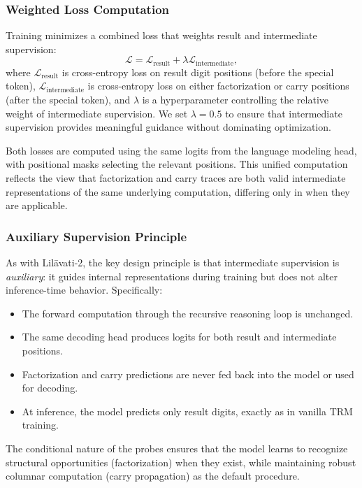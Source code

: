 \subsubsection{Weighted Loss Computation}
Training minimizes a combined loss that weights result and intermediate supervision:
\[
\mathcal{L} = \mathcal{L}_{\text{result}} + \lambda \mathcal{L}_{\text{intermediate}},
\]
where $\mathcal{L}_{\text{result}}$ is cross-entropy loss on result digit positions (before the special token), $\mathcal{L}_{\text{intermediate}}$ is cross-entropy loss on either factorization or carry positions (after the special token), and $\lambda$ is a hyperparameter controlling the relative weight of intermediate supervision. We set $\lambda = 0.5$ to ensure that intermediate supervision provides meaningful guidance without dominating optimization.

Both losses are computed using the same logits from the language modeling head, with positional masks selecting the relevant positions. This unified computation reflects the view that factorization and carry traces are both valid intermediate representations of the same underlying computation, differing only in when they are applicable.

\subsubsection{Auxiliary Supervision Principle}
As with Lil\={a}vati-2, the key design principle is that intermediate supervision is \emph{auxiliary}: it guides internal representations during training but does not alter inference-time behavior. Specifically:
\begin{itemize}
\item The forward computation through the recursive reasoning loop is unchanged.
\item The same decoding head produces logits for both result and intermediate positions.
\item Factorization and carry predictions are never fed back into the model or used for decoding.
\item At inference, the model predicts only result digits, exactly as in vanilla TRM training.
\end{itemize}

The conditional nature of the probes ensures that the model learns to recognize structural opportunities (factorization) when they exist, while maintaining robust columnar computation (carry propagation) as the default procedure.

